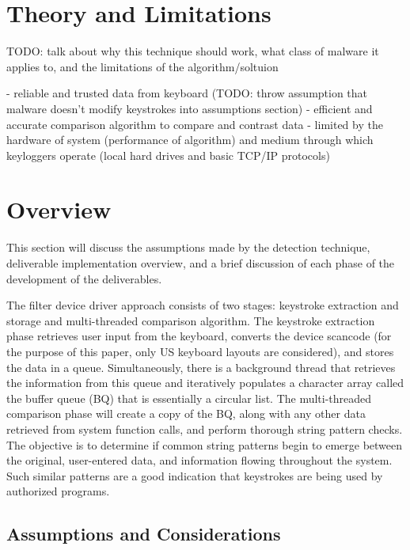 \documentclass[times, 10pt,twocolumn]{article}
\begin{document}
\section{Theory and Limitations} 
\label{Theory and Limitations} 
TODO: talk about why this technique should work, what class of malware it applies to, and the limitations of the algorithm/soltuion

- reliable and trusted data from keyboard (TODO: throw assumption that malware doesn't modify keystrokes into assumptions section)
- efficient and accurate comparison algorithm to compare and contrast data
- limited by the hardware of system (performance of algorithm) and medium through which keyloggers operate (local hard drives and basic TCP/IP protocols)

\section{Overview}
\label{Overview}

This section will discuss the assumptions made by the detection technique, deliverable implementation overview, and a brief discussion of each phase of the development of the deliverables. 

The filter device driver approach consists of two stages: keystroke extraction and storage and multi-threaded comparison algorithm. The keystroke extraction phase retrieves user input from the keyboard, converts the device scancode (for the purpose of this paper, only US keyboard layouts are considered), and stores the data in a queue. Simultaneously, there is a background thread that retrieves the information from this queue and iteratively populates a character array called the buffer queue (BQ) that is essentially a circular list. The multi-threaded comparison phase will create a copy of the BQ, along with any other data retrieved from system function calls, and perform thorough string pattern checks. The objective is to determine if common string patterns begin to emerge between the original, user-entered data, and information flowing throughout the system. Such similar patterns are a good indication that keystrokes are being used by authorized programs.

\subsection{Assumptions and Considerations} 
\label{Assumptions and Considerations} 
\end{document}
